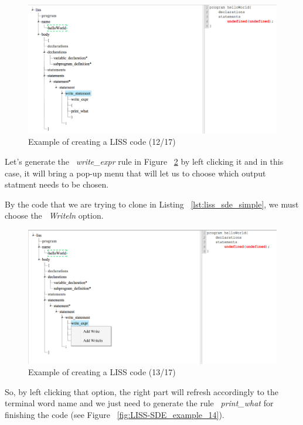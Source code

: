 \documentclass[
  oneside,
  11pt, a4paper,
  footinclude=true,
  headinclude=true,
  cleardoublepage=empty
]{scrbook}
\begin{document}
\begin{figure}[h!]
  \centering
    \includegraphics[width=1\textwidth]{img/LISS-SDE_creating_program/LISS-SDE12.png}
    \caption{Example of creating a LISS code (12/17)}
    \label{fig:LISS-SDE_example_12}
\end{figure}

Let's generate the ~\textit{write\_expr} rule in Figure ~\ref{fig:LISS-SDE_example_13} by left clicking it and in this case, it will bring a pop-up menu that will let us to choose which output statment needs to be chosen. 

By the code that we are trying to clone in Listing ~\ref{lst:liss_sde_simple}, we must choose the ~\textit{Writeln} option.

\begin{figure}[h!]
  \centering
    \includegraphics[width=1\textwidth]{img/LISS-SDE_creating_program/LISS-SDE13.png}
    \caption{Example of creating a LISS code (13/17)}
    \label{fig:LISS-SDE_example_13}
\end{figure}

So, by left clicking that option, the right part will refresh accordingly to the terminal word name and we just need to generate the rule ~\textit{print\_what} for finishing the code (see Figure ~\ref{fig:LISS-SDE_example_14}).
\end{document}
